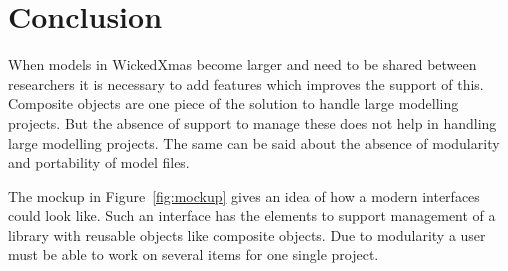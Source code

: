\documentclass[a4paper,11pt,final]{article}
\begin{document}
\newpage
\section{Conclusion}

When models in WickedXmas become larger and need to be shared
between researchers it is necessary to add features which improves the support of this.
Composite objects are one piece of the solution to handle large modelling projects.
But the absence of support to manage these does not help in handling large modelling projects.
The same can be said about the absence of modularity and portability of model files.

The mockup in Figure~\ref{fig:mockup} gives an idea of how a modern interfaces could look like.
Such an interface has the elements to support management of a library with
reusable objects like composite objects.
Due to modularity a user must be able to work on several items for one single project.
\end{document}
